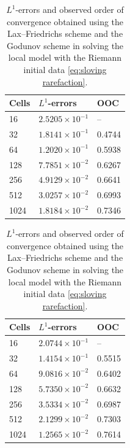 \begin{table}[H]
    \centering
    \begin{minipage}{0.45\textwidth}
        \centering
        \begin{tabular}{ |p{1.5cm}||p{2.2cm}| |p{1.5cm}| }
            \hline
            \textbf{Cells } & $L^{1}$-\textbf{errors}  & \textbf{OOC} \\
            \hline
            16              & $2.5205 \times 10^{-1}$  & --           \\
            32              & $1.8141 \times 10^{-1}$  & 0.4744       \\
            64              & $1.2020 \times 10^{-1}$  & 0.5938       \\
            128             & $7.7851 \times 10^{-2}$  & 0.6267       \\
            256             & $4.9129 \times 10^{-2}$  & 0.6641       \\
            512             & $3.0257 \times 10^{-2}$  & 0.6993       \\
            1024            & $1.8184 \times 10^{-2} $ & 0.7346       \\
            \hline
        \end{tabular}
        \caption*{(a) Lax--Friedrichs scheme}
    \end{minipage}
    \hfill
    \begin{minipage}{0.5\textwidth}
        \centering
        \begin{tabular}{ |p{1.5cm}||p{2.2cm}| |p{1.5cm}| }
            \hline
            \textbf{Cells } & $L^{1}$-\textbf{errors} & \textbf{OOC} \\
            \hline
            16              & $2.0744 \times 10^{-1}$ & --           \\
            32              & $1.4154 \times 10^{-1}$ & 0.5515       \\
            64              & $9.0816 \times 10^{-2}$ & 0.6402       \\
            128             & $5.7350 \times 10^{-2}$ & 0.6632       \\
            256             & $3.5334 \times 10^{-2}$ & 0.6987       \\
            512             & $2.1299 \times 10^{-2}$ & 0.7303       \\
            1024            & $1.2565 \times 10^{-2}$ & 0.7614       \\
            \hline
        \end{tabular}
        \caption*{(b) Godunov scheme}
    \end{minipage}

    \caption{$L^{1}$-errors and observed order of convergence obtained using the Lax--Friedrichs scheme and the Godunov scheme in solving the local model with the Riemann initial data \eqref{eq:sloving rarefaction}.}
    \label{tab:table_1}
\end{table}
